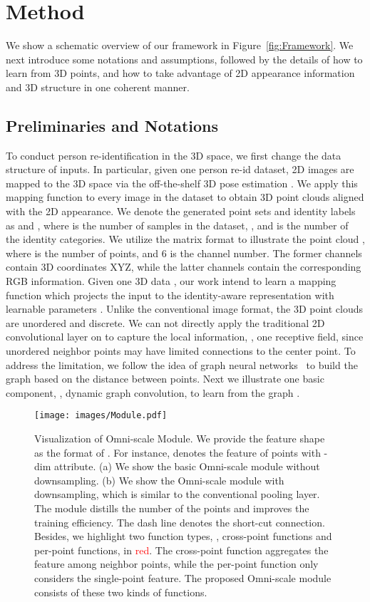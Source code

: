 \section{Method} \label{sec:method}
We show a schematic overview of our framework in Figure~\ref{fig:Framework}. We next introduce some notations and assumptions, followed by the details of how to learn from 3D points, and how to take advantage of 2D appearance information and 3D structure in one coherent manner. 

\subsection{Preliminaries and Notations}
To conduct person re-identification in the 3D space, we first change the data structure of inputs. In particular, given one person re-id dataset, 2D images are mapped to the 3D space via the off-the-shelf 3D pose estimation \cite{kanazawaHMR18}. We apply this mapping function to every image in the dataset to obtain 3D point clouds aligned with the 2D appearance. We denote the generated point sets and identity labels as  and , where  is the number of samples in the dataset, , and  is the number of the identity categories. 
We utilize the matrix format to illustrate the point cloud  , where  is the number of points, and 6 is the channel number. The former  channels contain 3D coordinates XYZ, while the latter  channels contain the corresponding RGB information. Given one 3D data  , our work intend to learn a mapping function  which projects the input  to the identity-aware representation  with learnable parameters . Unlike the conventional image format, the 3D point clouds are unordered and discrete. We can not directly apply the traditional 2D convolutional layer on  to capture the local information, \eg, one  receptive field, since unordered neighbor points may have limited connections to the center point. To address the limitation, we follow the idea of graph neural networks~\cite{scarselli2008graph} to build the graph  based on the distance between points. Next we illustrate one basic component, \ie, dynamic graph convolution, to learn from the graph . 

\begin{figure*}[t]
  \begin{center}
    \texttt{[image: images/Module.pdf]}
  \end{center}  
\caption{Visualization of Omni-scale Module. We provide the feature shape as the format of . For instance,  denotes the feature of  points with -dim attribute. (a) We show the basic Omni-scale module without downsampling. (b) We show the Omni-scale module with downsampling, which is similar to the conventional pooling layer. The module distills the number of the points and improves the training efficiency. 
  The dash line denotes the short-cut connection. Besides, we highlight two function types, \ie, cross-point functions and per-point functions, in \textcolor{red}{red}. The cross-point function aggregates the feature among neighbor points, while the per-point function only considers the single-point feature. The proposed Omni-scale module consists of these two kinds of functions.}
  \label{fig:module}
\end{figure*}
 
